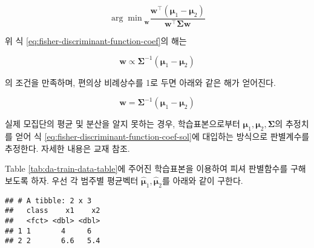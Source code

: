 \documentclass[]{book}
\newenvironment{Shaded}{\begin{snugshade}}{\end{snugshade}}
\newcommand{\DataTypeTok}[1]{\textcolor[rgb]{0.13,0.29,0.53}{#1}}
\newcommand{\KeywordTok}[1]{\textcolor[rgb]{0.13,0.29,0.53}{\textbf{#1}}}
\newcommand{\NormalTok}[1]{#1}
\newcommand{\OperatorTok}[1]{\textcolor[rgb]{0.81,0.36,0.00}{\textbf{#1}}}
\newcommand{\StringTok}[1]{\textcolor[rgb]{0.31,0.60,0.02}{#1}}
\begin{document}
\begin{equation}
{\arg\!\min}_{\mathbf{w}} \frac{\mathbf{w}^\top ( \boldsymbol\mu_1 - \boldsymbol\mu_2 )}{\mathbf{w}^\top \boldsymbol\Sigma \mathbf{w}} \label{eq:fisher-discriminant-function-coef}
\end{equation}

위 식 \eqref{eq:fisher-discriminant-function-coef}의 해는

\begin{equation*}
\mathbf{w} \propto \boldsymbol\Sigma^{-1}(\boldsymbol\mu_1 - \boldsymbol\mu_2)
\end{equation*}

의 조건을 만족하며, 편의상 비례상수를 1로 두면 아래와 같은 해가 얻어진다.

\begin{equation}
\mathbf{w} = \boldsymbol\Sigma^{-1}(\boldsymbol\mu_1 - \boldsymbol\mu_2) \label{eq:fisher-discriminant-function-coef-sol}
\end{equation}

실제 모집단의 평균 및 분산을 알지 못하는 경우, 학습표본으로부터 \(\boldsymbol\mu_1, \boldsymbol\mu_2, \boldsymbol\Sigma\)의 추정치를 얻어 식 \eqref{eq:fisher-discriminant-function-coef-sol}에 대입하는 방식으로 판별계수를 추정한다. 자세한 내용은 교재 \citep{jun2012datamining} 참조.

Table \ref{tab:da-train-data-table}에 주어진 학습표본을 이용하여 피셔 판별함수를 구해보도록 하자. 우선 각 범주별 평균벡터 \(\hat{\boldsymbol\mu}_1, \hat{\boldsymbol\mu}_2\)를 아래와 같이 구한다.

\begin{Shaded}
\end{Shaded}

\begin{verbatim}
## # A tibble: 2 x 3
##   class    x1    x2
##   <fct> <dbl> <dbl>
## 1 1       4     6  
## 2 2       6.6   5.4
\end{verbatim}
\end{document}
